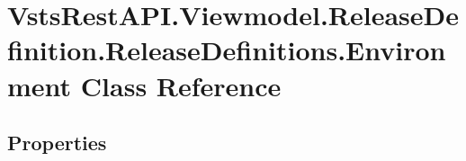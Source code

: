 \hypertarget{class_vsts_rest_a_p_i_1_1_viewmodel_1_1_release_definition_1_1_release_definitions_1_1_environment}{}\section{Vsts\+Rest\+A\+P\+I.\+Viewmodel.\+Release\+Definition.\+Release\+Definitions.\+Environment Class Reference}
\label{class_vsts_rest_a_p_i_1_1_viewmodel_1_1_release_definition_1_1_release_definitions_1_1_environment}
\subsection*{Properties}
